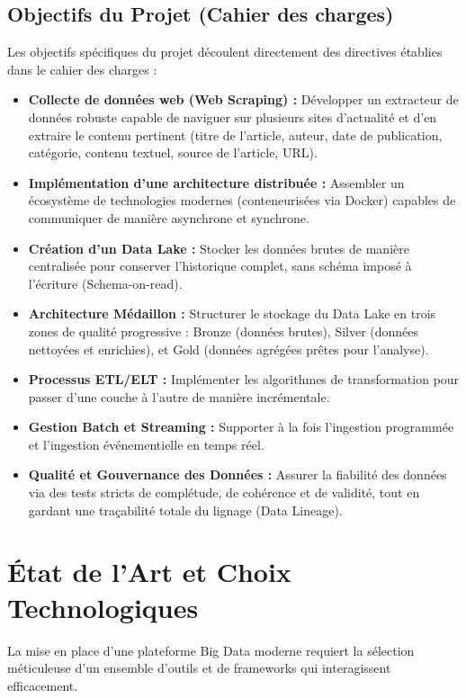 \documentclass[12pt,a4paper]{report}
\begin{document}
\section{Objectifs du Projet (Cahier des charges)}
Les objectifs spécifiques du projet découlent directement des directives établies dans le cahier des charges :
\begin{itemize}
    \item \textbf{Collecte de données web (Web Scraping) :} Développer un extracteur de données robuste capable de naviguer sur plusieurs sites d'actualité et d'en extraire le contenu pertinent (titre de l'article, auteur, date de publication, catégorie, contenu textuel, source de l'article, URL).
    \item \textbf{Implémentation d'une architecture distribuée :} Assembler un écosystème de technologies modernes (conteneurisées via Docker) capables de communiquer de manière asynchrone et synchrone.
    \item \textbf{Création d'un Data Lake :} Stocker les données brutes de manière centralisée pour conserver l'historique complet, sans schéma imposé à l'écriture (Schema-on-read).
    \item \textbf{Architecture Médaillon :} Structurer le stockage du Data Lake en trois zones de qualité progressive : Bronze (données brutes), Silver (données nettoyées et enrichies), et Gold (données agrégées prêtes pour l'analyse).
    \item \textbf{Processus ETL/ELT :} Implémenter les algorithmes de transformation pour passer d'une couche à l'autre de manière incrémentale.
    \item \textbf{Gestion Batch et Streaming :} Supporter à la fois l'ingestion programmée et l'ingestion événementielle en temps réel.
    \item \textbf{Qualité et Gouvernance des Données :} Assurer la fiabilité des données via des tests stricts de complétude, de cohérence et de validité, tout en gardant une traçabilité totale du lignage (Data Lineage).
\end{itemize}

\chapter{État de l'Art et Choix Technologiques}

La mise en place d'une plateforme Big Data moderne requiert la sélection méticuleuse d'un ensemble d'outils et de frameworks qui interagissent efficacement.
\end{document}
